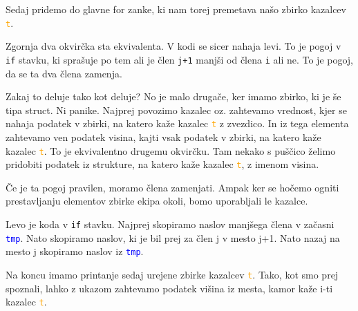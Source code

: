 \documentclass[a4paper, 12pt]{article}
\begin{document}
Sedaj pridemo do glavne for zanke, ki nam torej premetava našo zbirko kazalcev \textcolor{orange}{\texttt{t}}.\

{\centering
{}
\par
}

Zgornja dva okvirčka sta ekvivalenta. V kodi se sicer nahaja levi. To je pogoj v \lstinline|if| stavku, ki sprašuje po tem ali je člen \texttt{j+1} manjši od člena \texttt{i} ali ne. To je pogoj, da se ta dva člena zamenja.\

Zakaj to deluje tako kot deluje? No je malo drugače, ker imamo zbirko, ki je še tipa struct. Ni panike. Najprej povozimo kazalec oz. zahtevamo vrednost, kjer se nahaja podatek v zbirki, na katero kaže kazalec \textcolor{orange}{\texttt{t}} z zvezdico. In iz tega elementa zahtevamo ven podatek visina, kajti vsak podatek v zbirki, na katero kaže kazalec \textcolor{orange}{\texttt{t}}. To je ekvivalentno drugemu okvirčku. Tam nekako s puščico želimo pridobiti podatek iz strukture, na katero kaže kazalec \textcolor{orange}{\texttt{t}}, z imenom visina.\

Če je ta pogoj pravilen, moramo člena zamenjati. Ampak ker se hočemo ogniti prestavljanju elementov zbirke ekipa okoli, bomo uporabljali le kazalce. 

\begin{minipage}{0.75\textwidth}
Levo je koda v \lstinline|if| stavku. Najprej skopiramo naslov manjšega člena v začasni \textcolor{blue}{\texttt{tmp}}. Nato skopiramo naslov, ki je bil prej za člen j v mesto j+1. Nato nazaj na mesto j skopiramo naslov iz \textcolor{blue}{\texttt{tmp}}.
\end{minipage}



Na koncu imamo printanje sedaj urejene zbirke kazalcev \textcolor{orange}{\texttt{t}}. Tako, kot smo prej spoznali, lahko z ukazom  zahtevamo podatek višina iz mesta, kamor kaže i-ti kazalec \textcolor{orange}{\texttt{t}}.
\end{document}
